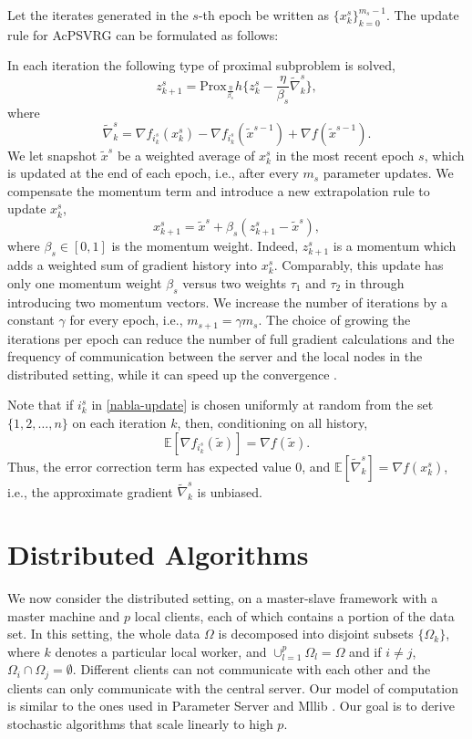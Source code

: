\documentclass{article}
\newcommand*{\Po}{\text{Prox}}
\newcommand*{\E}{\mathbb{E}}
\theoremstyle{definition}
\theoremstyle{remark}
\begin{document}
Let the iterates generated in the $s$-th epoch be written as $\{x_k^s\}_{k=0}^{m_s-1}$. The update rule for AcPSVRG can be formulated as follows: 

In each iteration the following type of proximal subproblem is solved,
\begin{equation}
z_{k+1}^s = \Po_{\frac{\eta}{\beta_s}} h \{z_{k}^s - \frac{\eta}{\beta_s}\widetilde{\nabla}_k^s\},
\end{equation}
where
\begin{equation}\label{nabla-update}
\widetilde{\nabla}_k^s = \nabla f_{i_k^s}(x_k^s) - \nabla f_{i_k^s}(\widetilde{x}^{s-1}) + \nabla f(\widetilde{x}^{s-1}).
\end{equation}
We let snapshot $\widetilde{x}^s$ be a weighted average of $x_k^{s}$ in the most recent epoch $s$, which is updated at the end of each epoch, i.e., after every $m_s$ parameter updates. We compensate the momentum term and introduce a new extrapolation rule to update $x_k^{s}$,
\[
x_{k+1}^s = \widetilde{x}^s+\beta_s(z_{k+1}^s-\widetilde{x}^s),
\]
where $\beta_s \in [0, 1]$ is the momentum weight. Indeed, $z_{k+1}^s$ is a momentum which adds a weighted sum of gradient history into $x_k^{s}$. Comparably, this update has only one momentum weight $\beta_s$ versus two weights $\tau_1$ and $\tau_2$ in \cite{Allen-Zhu17} through introducing two momentum vectors.  
We increase the number of
iterations by a constant $\gamma$ for every epoch, i.e., $m_{s+1} = \gamma m_{s}$.
The choice of growing the iterations per epoch can reduce the number of full gradient calculations and the frequency of communication between
the server and the local nodes in the distributed setting, while it can speed up the convergence \cite{Allen-Zhu2016I}.

Note that if $i_k^s$ in \eqref{nabla-update} is chosen uniformly at random from the set $\{1,2,\ldots,n\}$ on each iteration $k$, then, conditioning on all history,
\[
\E[\nabla f_{i_k^s}(\widetilde{x})] = \nabla f(\widetilde{x}).
\] 
Thus, the error correction term has expected value $0$, and $\E[\widetilde{\nabla}_k^s] = \nabla f(x_{k}^s)$, i.e., the approximate gradient $\widetilde{\nabla}_k^s$ is unbiased.

\section{Distributed Algorithms}

We now consider the distributed setting, on a master-slave framework with a master machine and $p$ local clients, each of which contains a portion of
the data set. In this setting, the whole data $\Omega$ is decomposed into disjoint
subsets $\{\Omega_k\}$,  where $k$ denotes  a  particular  local  worker,
and $\cup_{l=1}^p{\Omega_l} = \Omega$ and if $i\neq j$, $\Omega_i\cap\Omega_j = \emptyset$. Different clients can not communicate with each other and the  clients  can
only communicate with the central server. Our model of
computation is similar to the ones used in Parameter
Server \cite{Li2014} and Mllib \cite{Meng2016Spark}. Our goal is to
derive stochastic algorithms that scale linearly to high $p$.
\end{document}
